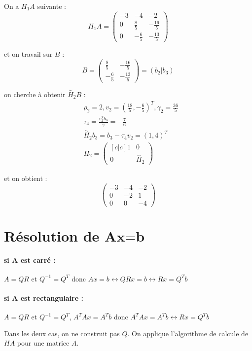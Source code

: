 \documentclass[a4paper,9pt]{extarticle}
\begin{document}
On a $H_1A$ suivante :
$$
H_1A = \begin{pmatrix}
-3 & -4 & -2 \\
0 & \frac{8}{5} & -\frac{16}{5} \\
0 & -\frac{6}{5} & -\frac{13}{5}
\end{pmatrix}
$$

et on travail sur $B$ :
$$
B = \begin{pmatrix}
\frac{8}{5} & -\frac{16}{5} \\
-\frac{6}{5} & -\frac{13}{5}
\end{pmatrix} = (b_2|b_3)
$$

on cherche à obtenir $\overset{\sim}{H}_2B$ :
\begin{align*}
& \rho_2 = 2, v_2 = (\frac{18}{5},-\frac{6}{5})^T, \gamma_2=\frac{36}{5} \\
& \tau_4 = \frac{v_2^Tb_3}{\gamma} = -\frac{7}{6}\\
& \overset{\sim}{H}_2b_3 = b_3 - \tau_4v_2 = (1,4)^T \\
& H_2 = 
\begin{pmatrix}[c|c]
1 & 0 \\ \hline
0 & \overset{\sim}{H}_2
\end{pmatrix}
\end{align*}

et on obtient :
$$
\begin{pmatrix}
-3 & -4 & -2 \\
0 & -2 & 1 \\
0 & 0 & -4
\end{pmatrix}
$$

\section{Résolution de $\textbf{Ax=b}$}

\paragraph*{si \textbf{A} est carré : } $A=QR$ et $Q^{-1}=Q^T$ donc $Ax=b \leftrightarrow QRx = b \leftrightarrow Rx = Q^Tb$
\paragraph*{si \textbf{A} est rectangulaire : } $A=QR$ et $Q^{-1}=Q^T$, $A^TAx=A^Tb$ donc $A^TAx=A^Tb\leftrightarrow Rx = Q^Tb$

Dans les deux cas, on ne construit pas $Q$. On applique l'algorithme de calcule de $HA$ pour une matrice $A$.
\end{document}
